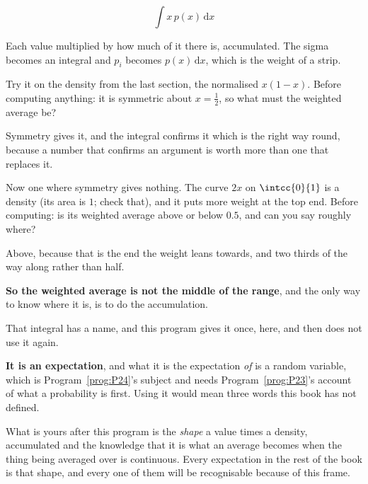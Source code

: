 \begin{fr}
\begin{ansblock}
\[ \int x\,p(x)\,\mathrm{d}x \]
\end{ansblock}

Each value multiplied by how much of it there is, accumulated. The sigma
becomes an integral and $p_i$ becomes $p(x)\,\mathrm{d}x$, which is the weight
of a strip.

Try it on the density from the last section, the normalised $x(1-x)$. Before
computing anything: it is symmetric about $x = \frac{1}{2}$, so what must the
weighted average be?
\nextframe
\end{fr}

\begin{fr}
Symmetry gives it, and the integral confirms it \dash{} which is the right way
round, because a number that confirms an argument is worth more than one that
replaces it.

Now one where symmetry gives nothing. The curve $2x$ on $\intcc{0}{1}$ is a
density (its area is $1$; check that), and it puts more weight at the top end.
Before computing: is its weighted average above or below $\num{0.5}$, and can
you say roughly where?
\dotline
\nextframe
\end{fr}

\begin{fr}
Above, because that is the end the weight leans towards, and two thirds of the
way along rather than half.

\textbf{So the weighted average is not the middle of the range}, and the only
way to know where it is, is to do the accumulation.

\end{fr}

\begin{fr}
That integral has a name, and this program gives it once, here, and then does
not use it again.

\textbf{It is an expectation}, and what it is the expectation \emph{of} is a
random variable, which is Program~\ref{prog:P24}'s subject and needs
Program~\ref{prog:P23}'s account of what a probability is first. Using it
would mean three words this book has not defined.

What is yours after this program is the \emph{shape} \dash{} a value times a
density, accumulated \dash{} and the knowledge that it is what an average
becomes when the thing being averaged over is continuous. Every expectation in
the rest of the book is that shape, and every one of them will be recognisable
because of this frame.
\end{fr}

